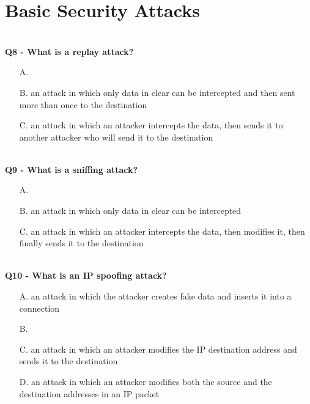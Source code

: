 \section{Basic Security Attacks}


\textbf{\\Q8 - What is a replay attack?}
\begin{enumerate}
    \item[A.] 
    \item[B.] an attack in which only data in clear can be intercepted and then sent more than once to the destination
    \item[C.] an attack in which an attacker intercepts the data, then sends it to another attacker who will send it to the destination
\end{enumerate}


\textbf{\\Q9 - What is a sniffing attack?}
\begin{enumerate}
    \item[A.] 
    \item[B.] an attack in which only data in clear can be intercepted
    \item[C.] an attack in which an attacker intercepts the data, then modifies it, then finally sends it to the destination
\end{enumerate}

\textbf{\\Q10 - What is an IP spoofing attack?}
\begin{enumerate}
    \item[A.] an attack in which the attacker creates fake data and inserts it into a connection
    \item[B.] 
    \item[C.] an attack in which an attacker modifies the IP destination address and sends it to the destination
    \item[D.] an attack in which an attacker modifies both the source and the destination addresses in an IP packet
\end{enumerate}

